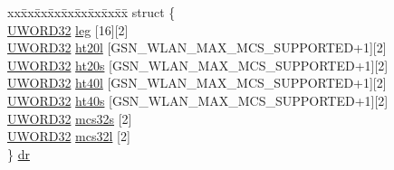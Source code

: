 \begin{DoxyCompactItemize}
\begin{tabbing}
\end{tabbing}\item 
\begin{tabbing}
xx\=xx\=xx\=xx\=xx\=xx\=xx\=xx\=xx\=\kill
struct \{\\
\>\hyperlink{a00677_gad0599cef3ddc489e9b2fe8afc3159f12}{UWORD32} \hyperlink{a00398_aaf690b30c7bb3b5f1b5675f84c7c92e5}{leg} \mbox{[}16\mbox{]}\mbox{[}2\mbox{]}\\
\>\hyperlink{a00677_gad0599cef3ddc489e9b2fe8afc3159f12}{UWORD32} \hyperlink{a00398_a5512e7cbb968332fffc963132021c2a9}{ht20l} \mbox{[}GSN\_WLAN\_MAX\_MCS\_SUPPORTED+1\mbox{]}\mbox{[}2\mbox{]}\\
\>\hyperlink{a00677_gad0599cef3ddc489e9b2fe8afc3159f12}{UWORD32} \hyperlink{a00398_ac3156ecb8d65f7e4aac2caf45fff0d1a}{ht20s} \mbox{[}GSN\_WLAN\_MAX\_MCS\_SUPPORTED+1\mbox{]}\mbox{[}2\mbox{]}\\
\>\hyperlink{a00677_gad0599cef3ddc489e9b2fe8afc3159f12}{UWORD32} \hyperlink{a00398_ab42c2405c4fac47ff38d981b9ebcb346}{ht40l} \mbox{[}GSN\_WLAN\_MAX\_MCS\_SUPPORTED+1\mbox{]}\mbox{[}2\mbox{]}\\
\>\hyperlink{a00677_gad0599cef3ddc489e9b2fe8afc3159f12}{UWORD32} \hyperlink{a00398_abb9b5107f666672351985f8fc94b7f54}{ht40s} \mbox{[}GSN\_WLAN\_MAX\_MCS\_SUPPORTED+1\mbox{]}\mbox{[}2\mbox{]}\\
\>\hyperlink{a00677_gad0599cef3ddc489e9b2fe8afc3159f12}{UWORD32} \hyperlink{a00398_af6ac2ed83df90516d588a62afe6df20f}{mcs32s} \mbox{[}2\mbox{]}\\
\>\hyperlink{a00677_gad0599cef3ddc489e9b2fe8afc3159f12}{UWORD32} \hyperlink{a00398_a6d5ba148df5237ec93937479cad72cd9}{mcs32l} \mbox{[}2\mbox{]}\\
\} \hyperlink{a00398_a1c685d934469a9c13b39da01ecc7813a}{dr}\\


\end{tabbing}
\end{DoxyCompactItemize}
